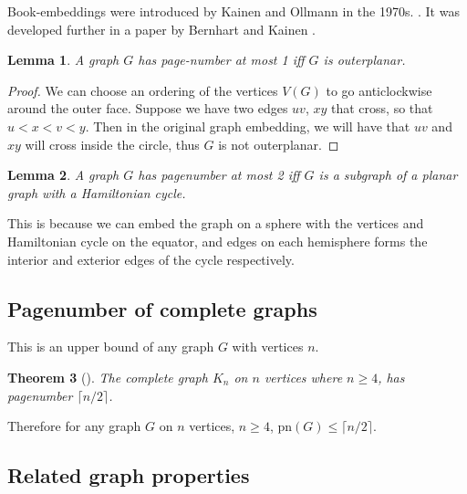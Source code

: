 \documentclass[]{report}
\newcommand{\pn}{\text{pn}}
\newtheorem{theorem}{Theorem}
\newtheorem{lemma}[theorem]{Lemma}
\theoremstyle{definition}
\numberwithin{theorem}{section}
\numberwithin{equation}{section}
\begin{document}
Book-embeddings were introduced by Kainen and Ollmann in the 1970s. \cite{kainenRecentResultsTopological1974} \cite{ollmannBookThicknessVarious1973}. It was developed further in a paper by Bernhart and Kainen \cite{bernhartBookThicknessGraph1979}. 
\begin{lemma}\label{lem:Pagenumber_1}
	A graph $G$ has page-number at most 1 iff $G$ is outerplanar.
\end{lemma}
\begin{proof}
	We can choose an ordering of the vertices $V(G)$ to go anticlockwise around the outer face. Suppose we have two edges $uv$, $xy$ that cross, so that $u < x < v < y$. Then in the original graph embedding, we will have that $uv$ and $xy$ will cross inside the circle, thus $G$ is not outerplanar. 
\end{proof}
\begin{lemma}\label{lem:Pagenumber_2}
	A graph $G$ has pagenumber at most 2 iff $G$ is a subgraph of a planar graph with a Hamiltonian cycle.
\end{lemma}
This is because we can embed the graph on a sphere with the vertices and Hamiltonian cycle on the equator, and edges on each hemisphere forms the interior and exterior edges of the cycle respectively.

\subsection{Pagenumber of complete graphs}\label{ssec:Pagenumber_Complete_Graphs}
This is an upper bound of any graph $G$ with vertices $n$. 
\begin{theorem}[\cite{bernhartBookThicknessGraph1979}]\label{thm:Pagenumber_Complete_Graph}
	The complete graph $K_n$ on $n$ vertices where $n \geq 4$, has pagenumber $\lceil n/2 \rceil$. 
\end{theorem}
 Therefore for any graph $G$ on $n$ vertices, $n \geq 4$, $\pn(G) \leq \lceil n/2 \rceil$. 
\subsection{Related graph properties}\label{ssec:Related_Properties}
\end{document}
